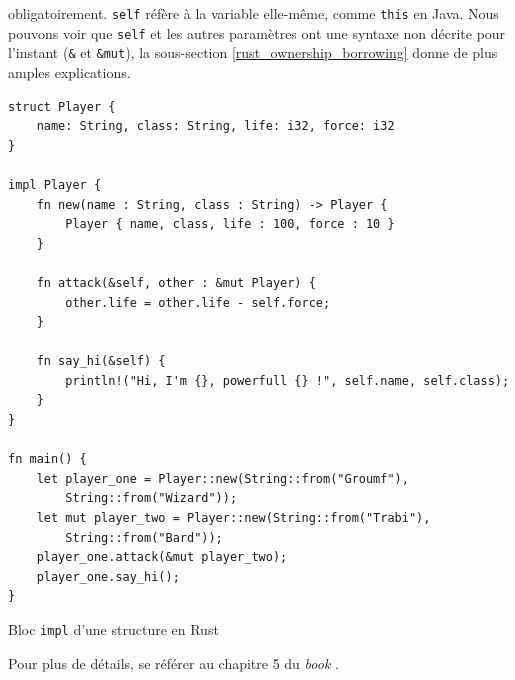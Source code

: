 obligatoirement. \texttt{self} réfère à la variable elle-même, comme \texttt{this} 
en Java. Nous pouvons voir que \texttt{self} et les autres paramètres ont une syntaxe non 
décrite pour l'instant (\texttt{&} et \texttt{&mut}), la sous-section 
\ref{rust_ownership_borrowing} donne de plus amples explications.
\bigbreak
\begin{code}
    \begin{verbatim}
struct Player {
    name: String, class: String, life: i32, force: i32
}

impl Player {
    fn new(name : String, class : String) -> Player {
        Player { name, class, life : 100, force : 10 }
    }

    fn attack(&self, other : &mut Player) {
        other.life = other.life - self.force;
    }

    fn say_hi(&self) {
        println!("Hi, I'm {}, powerfull {} !", self.name, self.class);
    }
}

fn main() {
    let player_one = Player::new(String::from("Groumf"),
        String::from("Wizard"));
    let mut player_two = Player::new(String::from("Trabi"),
        String::from("Bard"));
    player_one.attack(&mut player_two);
    player_one.say_hi();
}
    \end{verbatim}
    \caption{Bloc \texttt{impl} d'une structure en Rust}
    \label{rust_struct_impl}
\end{code}
\bigbreak
Pour plus de détails, se référer au chapitre 5 du \textit{book} \cite{ref0}.

